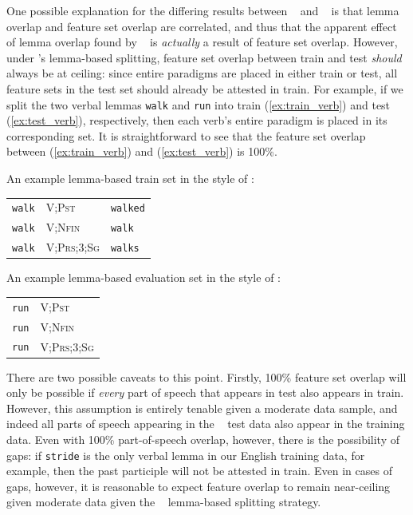 \documentclass[11pt]{article}
\newcommand{\goldmant}{\citet{goldman-etal-2022-un}}
\newcommand{\goldmana}{\citeauthor{goldman-etal-2022-un}}
\newcommand{\kodnert}{\citet{kodner-etal-2022-sigmorphon}}
\begin{document}
One possible explanation for the differing results between \goldmant~ and \kodnert~ is that lemma overlap and feature set overlap are correlated, and thus that the apparent effect of lemma overlap found by \goldmana~ is \textit{actually} a result of feature set overlap.
However, under  \goldmana's lemma-based splitting, feature set overlap between train and test \textit{should} always be at ceiling: since entire paradigms are placed in either train or test, all feature sets in the test set should already be attested in train. %
For example, if we split the two verbal lemmas \texttt{walk} and \texttt{run} into train (\ref{ex:train_verb}) and test (\ref{ex:test_verb}), respectively, then each verb's entire paradigm is placed in its corresponding set.
It is straightforward to see that the feature set overlap between (\ref{ex:train_verb}) and  (\ref{ex:test_verb}) is 100\%.


\begin{exe}
\ex\label{ex:train_verb} An example lemma-based train set in the style of \goldmana: \\
\begin{tabular}{lll}
\texttt{walk} & \textsc{V;Pst} & \texttt{walked}\\
\texttt{walk} & \textsc{V;Nfin} & \texttt{walk}\\
\texttt{walk} & \textsc{V;Prs;3;Sg} & \texttt{walks}\\
\end{tabular}
\ex\label{ex:test_verb}An example lemma-based evaluation set in the style of \goldmana: \\
\begin{tabular}{ll}
\texttt{run} & \textsc{V;Pst} \\
\texttt{run} & \textsc{V;Nfin} \\
\texttt{run} & \textsc{V;Prs;3;Sg}\\
\end{tabular}
\end{exe}

There are two possible caveats to this point.
Firstly, 100\% feature set overlap will only be possible if \textit{every} part of speech that appears in test also appears in train. 
However, this assumption is entirely tenable given a moderate data sample, and indeed all parts of speech appearing in the \goldmana~ test data also appear in the training data. 
Even with 100\% part-of-speech overlap, however, there is the possibility of gaps: if \texttt{stride} is the only verbal lemma in our English training data, for example, then the past participle will not be attested in train. 
Even in cases of gaps, however, it is reasonable to expect feature overlap to remain near-ceiling given moderate data given the \goldmana~ lemma-based splitting strategy. 
\end{document}

